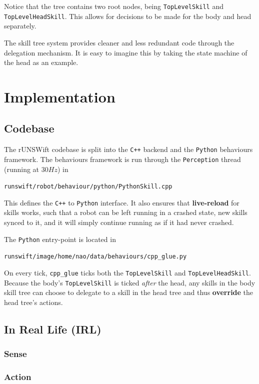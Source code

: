 Notice that the tree contains two root nodes, being \texttt{TopLevelSkill} and \texttt{TopLevelHeadSkill}. This allows for decisions to be made for the body and head separately.

The skill tree system provides cleaner and less redundant code through the delegation mechanism. It is easy to imagine this by taking the state machine of the head as an example.

\section{Implementation}

\subsection{Codebase}

The rUNSWift codebase is split into the \verb!C++! backend and the \verb!Python! behaviours framework. The behaviours framework is run through the \texttt{Perception} thread (running at $30Hz$) in 

\texttt{runswift/robot/behaviour/python/PythonSkill.cpp}

This defines the \verb!C++! to \verb!Python! interface. It also ensures that \textbf{live-reload} for skills works, such that a robot can be left running in a crashed state, new skills synced to it, and it will simply continue running as if it had never crashed.

The \verb!Python! entry-point is located in

\texttt{runswift/image/home/nao/data/behaviours/cpp\_glue.py}

On every tick, \texttt{cpp\_glue} ticks both the \texttt{TopLevelSkill} and \texttt{TopLevelHeadSkill}. Because the body's \texttt{TopLevelSkill} is ticked \textit{after} the head, any skills in the body skill tree can choose to delegate to a skill in the head tree and thus \textbf{override} the head tree's actions.

\subsection{In Real Life (IRL)}

\subsubsection{Sense}

\subsubsection{Action}

